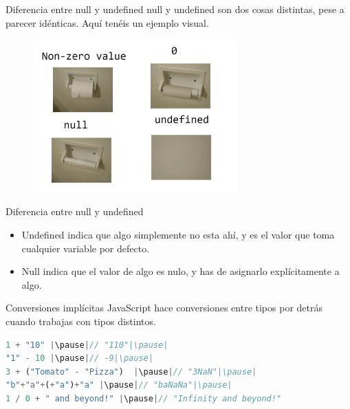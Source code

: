 \documentclass{beamer}
\begin{document}
\begin{frame}{Diferencia entre null y undefined}
null y undefined son dos cosas distintas, pese a parecer idénticas. Aquí tenéis un ejemplo visual.

    \begin{figure}
        \centering
        \includegraphics[width=0.7\textwidth]{images/undefinednull.png}
    \end{figure}
\end{frame}

\begin{frame}{Diferencia entre null y undefined}
\begin{itemize}
    \item Undefined indica que algo simplemente no esta ahí, y es el valor que toma cualquier variable por defecto.
    \item Null indica que el valor de algo es nulo, y has de asignarlo explícitamente a algo.
\end{itemize}
\end{frame}

\begin{frame}[fragile]{Conversiones implícitas}
JavaScript hace conversiones entre tipos por detrás cuando trabajas con tipos distintos.\pause

\begin{lstlisting}[language=JavaScript]
1 + "10" |\pause|// "110"|\pause|
"1" - 10 |\pause|// -9|\pause|
3 + ("Tomato" - "Pizza")  |\pause|// "3NaN"|\pause|
"b"+"a"+(+"a")+"a" |\pause|// "baNaNa"|\pause|
1 / 0 + " and beyond!" |\pause|// "Infinity and beyond!"
\end{lstlisting}
\end{frame}
\end{document}
